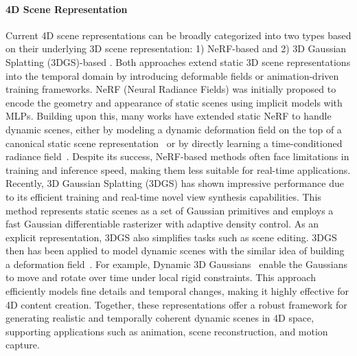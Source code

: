 \paragraph{4D Scene Representation}
Current 4D scene representations can be broadly categorized into two types based on their underlying 3D scene representation: 1) NeRF-based \citep{mildenhall2020nerf} and 2) 3D Gaussian Splatting (3DGS)-based \citep{kerbl20233dgs}. Both approaches extend static 3D scene representations into the temporal domain by introducing deformable fields or animation-driven training frameworks.
NeRF (Neural Radiance Fields) was initially proposed to encode the geometry and appearance of static scenes using implicit models with MLPs. Building upon this, many works have extended static NeRF to handle dynamic scenes, either by modeling a dynamic deformation field on the top of a canonical static scene representation~\citep{pons2021dnerf,tretschk2021nonrigidnerf,yuan2021stardnerf,park2021nerfies,fang2022fastdnerf} or by directly learning a time-conditioned radiance field~\citep{li2022neural3dvideo,gao2021dynamicviewsynthesis,park2021hypernerf,xian2021spacenerfvideo}. Despite its success, NeRF-based methods often face limitations in training and inference speed, making them less suitable for real-time applications.
Recently, 3D Gaussian Splatting (3DGS) has shown impressive performance due to its efficient training and real-time novel view synthesis capabilities. This method represents static scenes as a set of Gaussian primitives and employs a fast Gaussian differentiable rasterizer with adaptive density control. As an explicit representation, 3DGS also simplifies tasks such as scene editing. 
3DGS then has been applied to model dynamic scenes with the similar idea of building a deformation field~\citep{luiten2023dynamic3dgauss,wu20244dgauss,yang2024deformable4dgauss,zeng2024stag4d,wu2024sc4d}.
For example, Dynamic 3D Gaussians~\citep{luiten2023dynamic3dgauss} enable the Gaussians to move and rotate over time under local rigid constraints. This approach efficiently models fine details and temporal changes, making it highly effective for 4D content creation.
Together, these representations offer a robust framework for generating realistic and temporally coherent dynamic scenes in 4D space, supporting applications such as animation, scene reconstruction, and motion capture.

